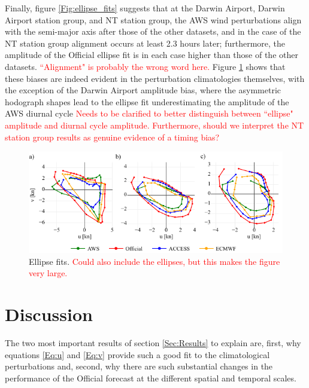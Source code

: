 \documentclass{ametsoc}
\begin{document}
Finally, figure \ref{Fig:ellipse_fits} suggests that at the Darwin Airport, Darwin Airport station group, and NT station group, the AWS wind perturbations align with the semi-major axis after those of the other datasets, and in the case of the NT station group alignment occurs at least 2.3 hours later; furthermore, the amplitude of the Official ellipse fit is in each case higher than those of the other datasets. \textcolor{red}{``Alignment" is probably the wrong word here.} Figure \ref{Fig:nt_ellipse_hodo} shows that these biases are indeed evident in the perturbation climatologies themselves, with the exception of the Darwin Airport amplitude bias, where the asymmetric hodograph shapes lead to the ellipse fit underestimating the amplitude of the AWS diurnal cycle \textcolor{red}{Needs to be clarified to better distinguish between ``ellipse" amplitude and diurnal cycle amplitude. Furthermore, should we interpret the NT station group results as genuine evidence of a timing bias?} 

\begin{figure}
\centering
\includegraphics[width=39pc]{nt_ellipse_hodo.pdf}
\caption{Ellipse fits. \textcolor{red}{Could also include the ellipses, but this makes the figure very large.}}
\label{Fig:nt_ellipse_hodo}
\end{figure}

\section{Discussion}
\label{Sec:Discussion}
The two most important results of section \ref{Sec:Results} to explain are, first, why equations \ref{Eq:u} and \ref{Eq:v} provide such a good fit to the climatological perturbations and, second, why there are such substantial changes in the performance of the Official forecast at the different spatial and temporal scales. 
\end{document}
